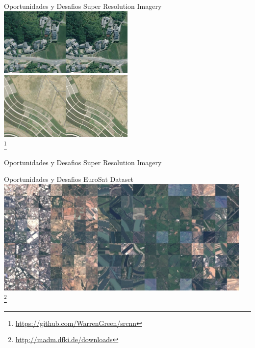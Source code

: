 \documentclass{beamer}
\newcommand\blfootnote[1]{%
  \begingroup
  \renewcommand\thefootnote{}\footnote{#1}%
  \addtocounter{footnote}{-1}%
  \endgroup
}
\begin{document}
\begin{frame}{Oportunidades y Desafios}
    Super Resolution Imagery \\
    \centering
    \includegraphics[width=0.5\textwidth]{figures/sr1}\\
    \includegraphics[width=0.5\textwidth]{figures/sr2}\\
    \blfootnote{\url{https://github.com/WarrenGreen/srcnn}}
\end{frame}
\begin{frame}{Oportunidades y Desafios}
    Super Resolution Imagery \\
    \centering
\end{frame}
\begin{frame}{Oportunidades y Desafios}
    EuroSat Dataset \\
    \centering
    \includegraphics[width=0.95\textwidth]{figures/eurosat}\\
    \blfootnote{\url{http://madm.dfki.de/downloads}}
\end{frame}
\end{document}
